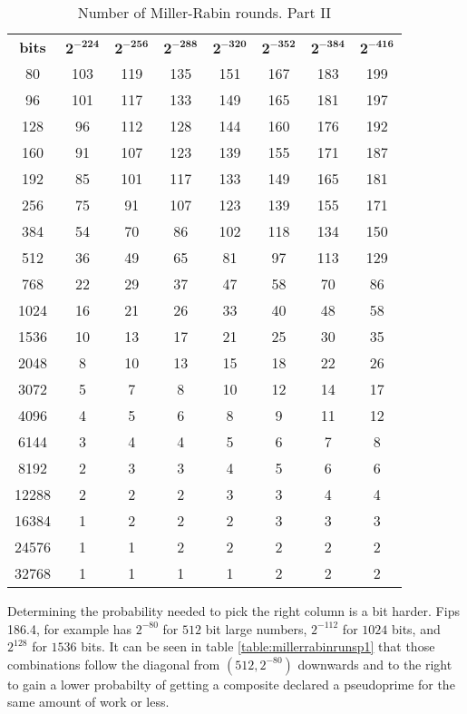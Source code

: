 \documentclass[synpaper]{book}
\begin{document}
\begin{table}[h]
\begin{center}
\begin{tabular}{c c c c c c c c}
\textbf{bits} &$\mathbf{2^{-224}}$ & $\mathbf{2^{-256}}$ & $\mathbf{2^{-288}}$ & $\mathbf{2^{-320}}$ & $\mathbf{2^{-352}}$ & $\mathbf{2^{-384}}$ & $\mathbf{2^{-416}}$\\
80    & 103 & 119 & 135 & 151 & 167 & 183 & 199 \\
96    & 101 & 117 & 133 & 149 & 165 & 181 & 197 \\
128   & 96  & 112 & 128 & 144 & 160 & 176 & 192 \\
160   & 91  & 107 & 123 & 139 & 155 & 171 & 187 \\
192   & 85  & 101 & 117 & 133 & 149 & 165 & 181 \\
256   & 75  & 91  & 107 & 123 & 139 & 155 & 171 \\
384   & 54  & 70  & 86  & 102 & 118 & 134 & 150 \\
512   & 36  & 49  & 65  & 81  & 97  & 113 & 129 \\
768   & 22  & 29  & 37  & 47  & 58  & 70  & 86  \\
1024  & 16  & 21  & 26  & 33  & 40  & 48  & 58  \\
1536  & 10  & 13  & 17  & 21  & 25  & 30  & 35  \\
2048  & 8   & 10  & 13  & 15  & 18  & 22  & 26  \\
3072  & 5   & 7   & 8	& 10  & 12  & 14  & 17  \\
4096  & 4   & 5   & 6	& 8   & 9   & 11  & 12  \\
6144  & 3   & 4   & 4	& 5   & 6   & 7   & 8	\\
8192  & 2   & 3   & 3	& 4   & 5   & 6   & 6	\\
12288 & 2   & 2   & 2	& 3   & 3   & 4   & 4	\\
16384 & 1   & 2   & 2	& 2   & 3   & 3   & 3	\\
24576 & 1   & 1   & 2	& 2   & 2   & 2   & 2	\\
32768 & 1   & 1   & 1	& 1   & 2   & 2   & 2
\end{tabular}
\caption{ Number of Miller-Rabin rounds. Part II } \label{table:millerrabinrunsp2}
\end{center}
\end{table}

Determining the probability needed to pick the right column is a bit harder. Fips 186.4, for example has $2^{-80}$ for $512$ bit large numbers, $2^{-112}$ for $1024$ bits, and $2^{128}$ for $1536$ bits. It can be seen in table \ref{table:millerrabinrunsp1} that those combinations follow the diagonal from $(512,2^{-80})$ downwards and to the right to gain a lower probabilty of getting a composite declared a pseudoprime for the same amount of work or less.
\end{document}
